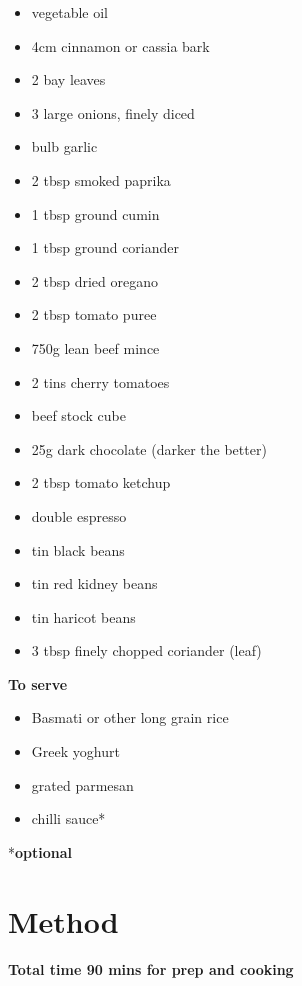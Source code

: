 \documentclass[
]{book}
\providecommand{\tightlist}{%
  \setlength{\itemsep}{0pt}\setlength{\parskip}{0pt}}
\begin{document}
\begin{itemize}
\tightlist
\item
  vegetable oil
\item
  4cm cinnamon or cassia bark
\item
  2 bay leaves
\item
  3 large onions, finely diced
\item
  bulb garlic
\item
  2 tbsp smoked paprika
\item
  1 tbsp ground cumin
\item
  1 tbsp ground coriander
\item
  2 tbsp dried oregano
\item
  2 tbsp tomato puree
\item
  750g lean beef mince
\item
  2 tins cherry tomatoes
\item
  beef stock cube
\item
  25g dark chocolate (darker the better)
\item
  2 tbsp tomato ketchup
\item
  double espresso
\item
  tin black beans
\item
  tin red kidney beans
\item
  tin haricot beans
\item
  3 tbsp finely chopped coriander (leaf)
\end{itemize}

\textbf{To serve}

\begin{itemize}
\tightlist
\item
  Basmati or other long grain rice
\item
  Greek yoghurt
\item
  grated parmesan
\item
  chilli sauce*
\end{itemize}

*\textbf{optional}

\hypertarget{method-3}{%
\section{Method}\label{method-3}}

\textbf{Total time 90 mins for prep and cooking}
\end{document}
